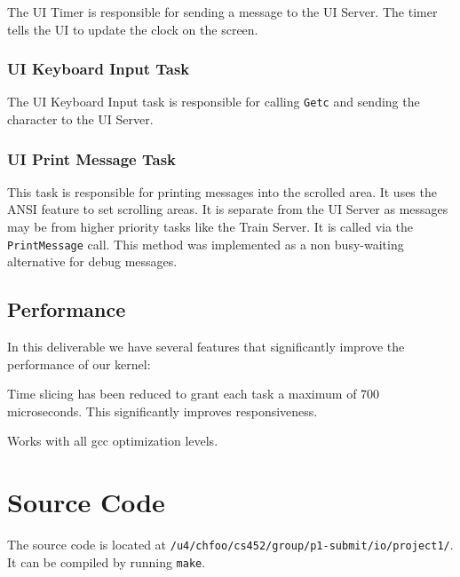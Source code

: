 \documentclass[letterpaper]{article}
\begin{document}
The UI Timer is responsible for sending a message to the UI Server. The timer tells the UI to update the clock on the screen.


\subsubsection{UI Keyboard Input Task%
  \label{ui-keyboard-input-task}%
}

The UI Keyboard Input task is responsible for calling \texttt{Getc} and sending the character to the UI Server.


\subsubsection{UI Print Message Task%
  \label{ui-print-message-task}%
}

This task is responsible for printing messages into the scrolled area. It uses the ANSI feature to set scrolling areas. It is separate from the UI Server as messages may be from higher priority tasks like the Train Server. It is called via the \texttt{PrintMessage} call.  This method was implemented as a non busy-waiting alternative for debug messages.


\subsection{Performance%
  \label{performance}%
}

In this deliverable we have several features that significantly improve the performance of our kernel:
\setcounter{listcnt0}{0}
\begin{list}{)}
{
\setlength{\rightmargin}{\leftmargin}
}

\item Time slicing has been reduced to grant each task a maximum of 700 microseconds.  This significantly improves responsiveness.

\item Works with all gcc optimization levels.
\end{list}


\section{Source Code%
  \label{source-code}%
}

The source code is located at \texttt{/u4/chfoo/cs452/group/p1-submit/io/project1/}. It can be compiled by running \texttt{make}.
\end{document}
